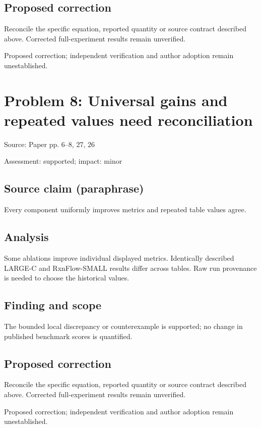 \documentclass[11pt]{article}
\begin{document}
\subsection*{Proposed correction}

Reconcile the specific equation, reported quantity or source contract described above. Corrected full-experiment results remain unverified.

Proposed correction; independent verification and author adoption remain unestablished.

\section*{Problem 8: Universal gains and repeated values need reconciliation}

Source: Paper pp. 6–8, 27, 26

Assessment: supported; impact: minor

\subsection*{Source claim (paraphrase)}

Every component uniformly improves metrics and repeated table values agree.

\subsection*{Analysis}

Some ablations improve individual displayed metrics. Identically described LARGE-C and RxnFlow-SMALL results differ across tables. Raw run provenance is needed to choose the historical values.

\subsection*{Finding and scope}

The bounded local discrepancy or counterexample is supported; no change in published benchmark scores is quantified.

\subsection*{Proposed correction}

Reconcile the specific equation, reported quantity or source contract described above. Corrected full-experiment results remain unverified.

Proposed correction; independent verification and author adoption remain unestablished.
\end{document}
